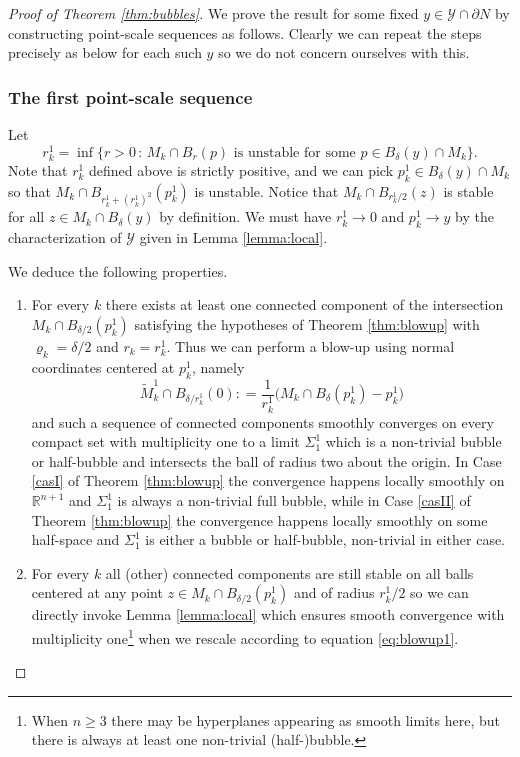 \documentclass[JEP,XML,SOM,Unicode]{cedram}
\let\mathcal\mathscr
\newenvironment{enumeratea}
{\bgroup\def\theenumi{\alph{enumi}}\begin{enumerate}}
{\end{enumerate}\egroup}
\newcounter{cas}
\newcommand{\sep}{\,:\,}
\theoremstyle{definition}
\newcommand{\R}{\mathbb{R}}
\begin{document}
\begin{proof}[Proof of Theorem \ref{thm:bubbles}]
We prove the result for some fixed $y\in\mathcal{Y}\cap \partial N$ by constructing point-scale sequences as follows. Clearly we can repeat the steps precisely as below for each such $y$ so we do not concern ourselves with this.

\subsubsection*{The first point-scale sequence} Let
\begin{equation*}
r^1_k = \inf \big\{r>0 \sep M_k\cap B_r(p) \text{ is unstable for some } p\in B_\delta(y)\cap M_k \big\}.
\end{equation*}
Note that $r^1_k$ defined above is strictly positive, and we can pick $p^1_k\in B_\delta(y)\cap M_k$ so that $M_k\cap B_{r^1_k+(r^1_k)^2}(p^1_k)$ is unstable. Notice that $M_k\cap B_{r^1_k/2}(z)$ is stable for all $z\in M_k\cap B_\delta (y)$ by definition.
We must have $r^1_k\to 0$ and $p^1_k\to y$ by the characterization of $\mathcal{Y}$ given in Lemma \ref{lemma:local}.

We deduce the following properties.
\begin{enumeratea}
\item
For every $k$ there exists at least one connected component of the intersection $M_k\cap B_{\delta/2}(p^1_k)$ satisfying the hypotheses of Theorem \ref{thm:blowup} with $\varrho_k = \delta/2$ and $r_k=r^1_k$. Thus we can perform a blow-up using normal coordinates centered at $p^1_k$, namely
\begin{equation}\label{eq:blowup1}
\widetilde{M}^1_k \cap B_{\delta/r^1_k}(0) : = \frac{1}{r^1_k} \big(M_k\cap B_\delta(p^1_k)- p^1_k\big)
\end{equation}
and such a sequence of connected components
smoothly converges on every compact set with multiplicity one to a limit $\Sigma^1_1$ which is a non-trivial bubble or half-bubble and intersects the ball of radius two about the origin. In Case \ref{casI} of Theorem \ref{thm:blowup} the convergence happens locally smoothly on $\R^{n+1}$ and $\Sigma^1_1$ is always a non-trivial full bubble, while in Case \ref{casII} of Theorem \ref{thm:blowup} the convergence happens locally smoothly on some half-space and $\Sigma^1_1$ is either a bubble or half-bubble, non-trivial in either case.

\item
For every $k$ all (other) connected components are still stable on all balls centered at any point $z\in M_k\cap B_{\delta/2}(p^1_k)$ and of radius $r^1_k/2$ so we can directly invoke Lemma \ref{lemma:local} which ensures smooth convergence with multiplicity one\footnote{When $n\geq 3$ there may be hyperplanes appearing as smooth limits here, but there is always at least one non-trivial (half-)bubble.} when we rescale according to equation \eqref{eq:blowup1}.
\end{enumeratea}


\end{proof}
\end{document}
